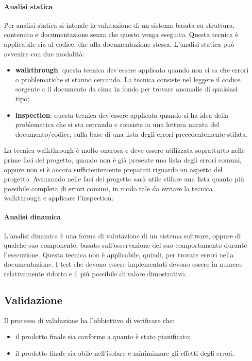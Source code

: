 \documentclass[../NormeProgetto.tex]{subfiles}
\begin{document}
				\paragraph{Analisi statica} 
					Per analisi statica si intende la valutazione di un sistema basata su struttura, contenuto e documentazione senza che questo venga eseguito. Questa tecnica è applicabile sia al codice, che alla documentazione stessa. L'analisi statica può avvenire con due modalità:
					\begin{itemize}
						\item \textbf{walkthrough}: questa tecnica dev'essere applicata quando non si sa che errori o problematiche si stanno cercando. La tecnica consiste nel leggere il codice sorgente o il documento da cima in fondo per trovare anomalie  di qualsiasi tipo;
						\item \textbf{inspection}: questa tecnica dev'essere applicata quando si ha idea della problematica che si sta cercando e consiste in una lettura mirata del documento/codice, sulla base di una lista degli errori precedentemente stilata.
					\end{itemize}
					La tecnica walkthrough è molto onerosa e deve essere utilizzata soprattutto nelle prime fasi del progetto, quando non è già presente una lista degli errori comuni, oppure non si è ancora sufficientemente preparati riguardo un aspetto del progetto. Avanzando nelle fasi del progetto sarà utile stilare una lista quanto più possibile completa di errori comuni, in modo tale da evitare la tecnica walkthrough e applicare l'inspection.
				
				\paragraph{Analisi dinamica}
					L'analisi dinamica è una forma di valutazione di un sistema software\g, oppure di qualche suo componente, basato sull'osservazione del suo comportamento durante l'esecuzione. Questa tecnica non è applicabile, quindi, per trovare errori nella documentazione. I test che devono essere implementati devono essere in numero relativamente ridotto e il più possibile di valore dimostrativo.	
			
			
			
		
	
\subsection{Validazione}
		Il processo di validazione ha l'obbiettivo di verificare che: 
		\begin{itemize}
			\item il prodotto finale sia conforme a quanto è stato pianificato;
			\item il prodotto finale sia abile nell'isolare e minimizzare gli effetti degli errori.
		\end{itemize}
\end{document}
